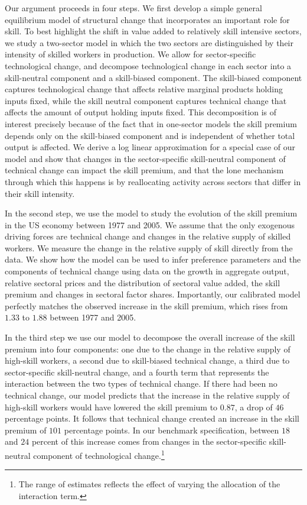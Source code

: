 \documentclass[12pt,english]{article}
\begin{document}
Our argument proceeds in four steps. We first develop a simple general
equilibrium model of structural change that incorporates an important role
for skill. To best highlight the shift in value added to relatively skill
intensive sectors, we study a two-sector model in which the two sectors are
distinguished by their intensity of skilled workers in production. We allow
for sector-specific technological change, and decompose technological change
in each sector into a skill-neutral component and a skill-biased component.
The skill-biased component captures technological change that affects
relative marginal products holding inputs fixed, while the skill neutral
component captures technical change that affects the amount of output
holding inputs fixed. This decomposition is of interest precisely because of
the fact that in one-sector models the skill premium depends only on the
skill-biased component and is independent of whether total output is
affected. We derive a log linear approximation for a special case of our
model and show that changes in the sector-specific skill-neutral component
of technical change can impact the skill premium, and that the lone
mechanism through which this happens is by reallocating activity across
sectors that differ in their skill intensity.

In the second step, we use the model to study the evolution of the skill
premium in the US economy between 1977 and 2005. We assume that the only
exogenous driving forces are technical change and changes in the relative
supply of skilled workers. We measure the change in the relative supply of
skill directly from the data. We show how the model can be used to infer
preference parameters and the components of technical change using data on
the growth in aggregate output, relative sectoral prices and the
distribution of sectoral value added, the skill premium and changes in
sectoral factor shares. Importantly, our calibrated model perfectly matches
the observed increase in the skill premium, which rises from $1.33$ to $1.88$
between 1977 and 2005.

In the third step we use our model to decompose the overall increase of the
skill premium into four components: one due to the change in the relative
supply of high-skill workers, a second due to skill-biased technical change,
a third due to sector-specific skill-neutral change, and a fourth term that
represents the interaction between the two types of technical change. If
there had been no technical change, our model predicts that the increase in
the relative supply of high-skill workers would have lowered the skill
premium to $0.87$, a drop of $46$ percentage points. It follows that
technical change created an increase in the skill premium of $101$
percentage points. In our benchmark specification, between $18$ and $24$
percent of this increase comes from changes in the sector-specific
skill-neutral component of technological change.\footnote{%
The range of estimates reflects the effect of varying the allocation of the
interaction term.}
\end{document}
